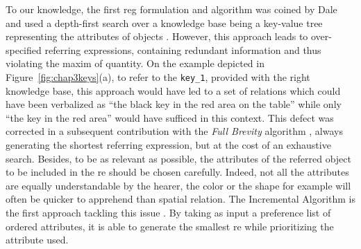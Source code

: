 \documentclass[a4paper,11pt,twoside]{StyleThese}
\begin{document}
To our knowledge, the first \acrshort{reg} formulation and algorithm was coined by Dale and used a depth-first search over a knowledge base being a key-value tree representing the attributes of objects \cite{dale1989cooking}. However, this approach leads to over-specified referring expressions, containing redundant information and thus violating the maxim of quantity. On the example depicted in Figure~\ref{fig:chap3keys}(a), to refer to the \verb'key_1', provided with the right knowledge base, this approach would have led to a set of relations which could have been verbalized as ``the black key in the red area on the table'' while only ``the key in the red area'' would have sufficed in this context. This defect was corrected in a subsequent contribution with the \textit{Full Brevity} algorithm \cite{dale1992generating}, always generating the shortest referring expression, but at the cost of an exhaustive search. Besides, to be as relevant as possible, the attributes of the referred object to be included in the \acrshort{re} should be chosen carefully. Indeed, not all the attributes are equally understandable by the hearer, the color or the shape for example will often be quicker to apprehend than spatial relation. The Incremental Algorithm is the first approach tackling this issue \cite{dale1995computational}. By taking as input a preference list of ordered attributes, it is able to generate the smallest \acrshort{re} while prioritizing the attribute used.
\end{document}

